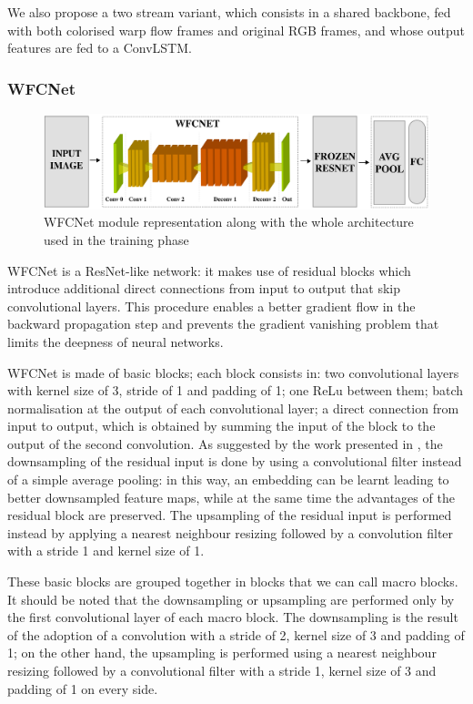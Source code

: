 \documentclass[10pt,twocolumn,letterpaper]{article}
\begin{document}
We also propose a two stream variant, which consists in a shared backbone, fed with both colorised warp flow frames and original RGB frames, and whose output features are fed to a ConvLSTM.

\subsubsection{WFCNet}

\begin{figure}
	\begin{center}
		\includegraphics[width=\textwidth]{schemi/WFCNet_img.pdf}		
	\end{center}
	\caption{WFCNet module representation along with the whole architecture used in the training phase}
	\label{fig:WFCNet}
\end{figure}

WFCNet is a ResNet-like network: it makes use of residual blocks which introduce additional direct connections from input to output that skip convolutional layers. This procedure enables a better gradient flow in the backward propagation step and prevents the gradient vanishing problem that limits the deepness of neural networks.

WFCNet is made of basic blocks; each block consists in: two convolutional layers with kernel size of 3, stride of 1 and padding of 1; one ReLu between them; batch normalisation at the output of each convolutional layer; a direct connection from input to output, which is obtained by summing the input of the block to the output of the second convolution.
As suggested by the work presented in \cite{springenberg2014striving}, the downsampling of the residual input is done by using a convolutional filter instead of a simple average pooling: in this way, an embedding can be learnt leading to better downsampled feature maps, while at the same time the advantages of the residual block are preserved.
The upsampling of the residual input is performed instead by applying a nearest neighbour resizing followed by a convolution filter with a stride 1 and kernel size of 1.

These basic blocks are grouped together in blocks that we can call macro blocks. It should be noted that the downsampling or upsampling are performed only by the first convolutional layer of each macro block. The downsampling is the result of the adoption of a convolution with a stride of 2, kernel size of 3 and padding of 1; on the other hand, the upsampling is performed using a nearest neighbour resizing followed by a convolutional filter with a stride 1, kernel size of 3 and padding of 1 on every side. 
\end{document}
